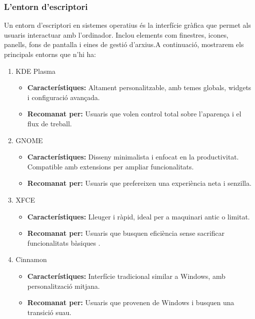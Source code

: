 \subsubsection{L'entorn d'escriptori}
Un entorn d'escriptori en sistemes operatius és la interfície gràfica que permet als usuaris interactuar amb l'ordinador. Inclou elements com finestres, icones, panells, fons de pantalla i eines de gestió d'arxius.A continuació, mostrarem els principals entorns que n'hi ha:
\begin{enumerate}
 \item KDE Plasma
 \begin{itemize}
  \item \textbf{Característiques: } Altament personalitzable, amb temes globals, widgets i configuració avançada.
  \item \textbf{Recomanat per:} Usuaris que volen control total sobre l'aparença i el flux de treball.
 \end{itemize}

 \item GNOME
 \begin{itemize}
  \item \textbf{Característiques:} Disseny minimalista i enfocat en la productivitat. Compatible amb extensions per ampliar funcionalitats.
  \item \textbf{Recomanat per: }  Usuaris que prefereixen una experiència neta i senzilla.
 \end{itemize}


 \item XFCE
\begin{itemize}
  \item \textbf{Característiques:} Lleuger i ràpid, ideal per a maquinari antic o limitat.
  \item \textbf{Recomanat per: } Usuaris que busquen eficiència sense sacrificar funcionalitats bàsiques .
 \end{itemize}

 \item Cinnamon
\begin{itemize}
  \item \textbf{Característiques:} Interfície tradicional similar a Windows, amb personalització mitjana.
  \item \textbf{Recomanat per: } Usuaris que provenen de Windows i busquen una transició suau.
 \end{itemize}


\end{enumerate}

